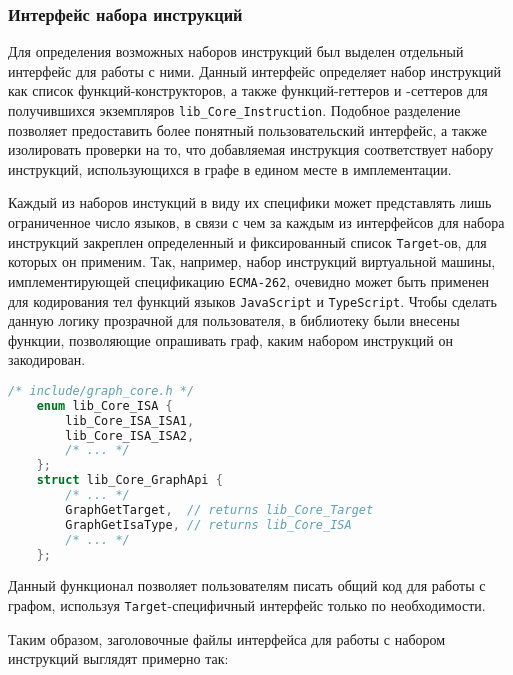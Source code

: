 \subsubsection{Интерфейс набора инструкций}

Для определения возможных наборов инструкций был выделен отдельный интерфейс для работы с ними. Данный интерфейс определяет набор инструкций как список функций-конструкторов, а также функций-геттеров и -сеттеров для получившихся экземпляров \texttt{lib\_Core\_Instruction}. Подобное разделение позволяет предоставить более понятный пользовательский интерфейс, а также изолировать проверки на то, что добавляемая инструкция соответствует набору инструкций, использующихся в графе в едином месте в имплементации.

Каждый из наборов инстукций в виду их специфики может представлять лишь ограниченное число языков, в связи с чем за каждым из интерфейсов для набора инструкций закреплен определенный и фиксированный список \texttt{Target}-ов, для которых он применим. Так, например, набор инструкций виртуальной машины, имплементирующей спецификацию \texttt{ECMA-262}, очевидно может быть применен для кодирования тел функций языков \texttt{JavaScript} и \texttt{TypeScript}. Чтобы сделать данную логику прозрачной для пользователя, в библиотеку были внесены функции, позволяющие опрашивать граф, каким набором инструкций он закодирован.

\begin{lstlisting}[language=C, label=lst:libIsaApi]
    /* include/graph_core.h */
    enum lib_Core_ISA {
        lib_Core_ISA_ISA1,
        lib_Core_ISA_ISA2,
        /* ... */
    };
    struct lib_Core_GraphApi {
        /* ... */
        GraphGetTarget,  // returns lib_Core_Target
        GraphGetIsaType, // returns lib_Core_ISA
        /* ... */
    };
\end{lstlisting}

Данный функционал позволяет пользователям писать общий код для работы с графом, используя \texttt{Target}-специфичный интерфейс только по необходимости.

Таким образом, заголовочные файлы интерфейса для работы с набором инструкций выглядят примерно так:

